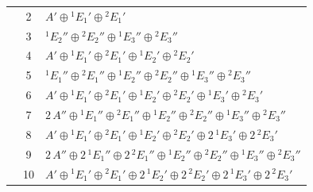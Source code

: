 \documentclass[11pt]{article}
\begin{document}
\begin{longtable}{l c p{}}
 & 2 & $A'\oplus {}^{1}E_{1}'\oplus {}^{2}E_{1}'$\\
 & 3 & ${}^{1}E_{2}''\oplus {}^{2}E_{2}''\oplus {}^{1}E_{3}''\oplus {}^{2}E_{3}''$\\
 & 4 & $A'\oplus {}^{1}E_{1}'\oplus {}^{2}E_{1}'\oplus {}^{1}E_{2}'\oplus {}^{2}E_{2}'$\\
 & 5 & ${}^{1}E_{1}''\oplus {}^{2}E_{1}''\oplus {}^{1}E_{2}''\oplus {}^{2}E_{2}''\oplus {}^{1}E_{3}''\oplus {}^{2}E_{3}''$\\
 & 6 & $A'\oplus {}^{1}E_{1}'\oplus {}^{2}E_{1}'\oplus {}^{1}E_{2}'\oplus {}^{2}E_{2}'\oplus {}^{1}E_{3}'\oplus {}^{2}E_{3}'$\\
 & 7 & $2\,A''\oplus {}^{1}E_{1}''\oplus {}^{2}E_{1}''\oplus {}^{1}E_{2}''\oplus {}^{2}E_{2}''\oplus {}^{1}E_{3}''\oplus {}^{2}E_{3}''$\\
 & 8 & $A'\oplus {}^{1}E_{1}'\oplus {}^{2}E_{1}'\oplus {}^{1}E_{2}'\oplus {}^{2}E_{2}'\oplus 2\,{}^{1}E_{3}'\oplus 2\,{}^{2}E_{3}'$\\
 & 9 & $2\,A''\oplus 2\,{}^{1}E_{1}''\oplus 2\,{}^{2}E_{1}''\oplus {}^{1}E_{2}''\oplus {}^{2}E_{2}''\oplus {}^{1}E_{3}''\oplus {}^{2}E_{3}''$\\
 & 10 & $A'\oplus {}^{1}E_{1}'\oplus {}^{2}E_{1}'\oplus 2\,{}^{1}E_{2}'\oplus 2\,{}^{2}E_{2}'\oplus 2\,{}^{1}E_{3}'\oplus 2\,{}^{2}E_{3}'$\\
\hline
\end{longtable}
\end{document}

